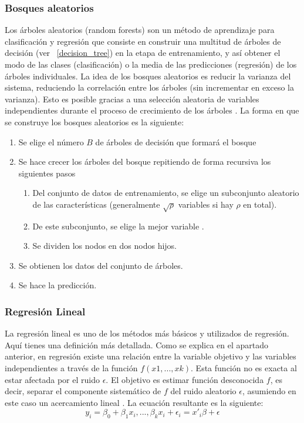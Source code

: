 \documentclass[12pt,a4paper,Spanish]{article}
\begin{document}
\subsubsection{Bosques aleatorios}
Los árboles aleatorios (random forests) son un método de aprendizaje para clasificación y regresión que consiste en construir una multitud de árboles de decisión (ver ~\ref{decision_tree}) en la etapa de entrenamiento, y así obtener el modo de las clases (clasificación) o la media de las predicciones (regresión) de los árboles individuales.
\newline
La idea de los bosques aleatorios es reducir la varianza del sistema, reduciendo la correlación entre los árboles (sin incrementar en exceso la varianza). Esto es posible gracias a una selección aleatoria de variables independientes durante el proceso de crecimiento de los árboles \cite{hastie2009elements}.
\newline
La forma en que se construye los bosques aleatorios es la siguiente:
\begin{enumerate}
	\item Se elige el número $B$ de árboles de decisión que formará el bosque
	\item Se hace crecer los árboles del bosque repitiendo de forma recursiva los siguientes pasos
	\begin{enumerate}
		\item Del conjunto de datos de entrenamiento, se elige un subconjunto aleatorio de las características (generalmente $\sqrt{\rho}$ variables si hay $\rho$ en total).
		\item De este subconjunto, se elige la mejor variable .
		\item Se dividen los nodos en dos nodos hijos.
	\end{enumerate}
	\item Se obtienen los datos del conjunto de árboles.
	\item Se hace la predicción.
\end{enumerate}


\subsubsection{Regresión Lineal}
La regresión lineal es uno de los métodos más básicos y  utilizados de regresión. Aquí tienes una definición más detallada. Como se explica en el apartado anterior, en regresión existe una relación entre la variable objetivo y las variables independientes a través de la función $f(x1, ..., xk)$. Esta función no es exacta al estar afectada por el ruido $\epsilon$. El objetivo es estimar función desconocida $f$, es decir, separar el componente sistemático de $f$ del ruido aleatorio $\epsilon$, asumiendo en este caso un acercamiento lineal \cite{fahrmeir2013regression}. La ecuación resultante es la siguiente:
\begin{equation}
	y_i = 
	\beta_0 + \beta_1x_i, ..., \beta_kx_i + \epsilon_i = 
	 x'_i\beta + \epsilon 
\end{equation}
 
\end{document}
